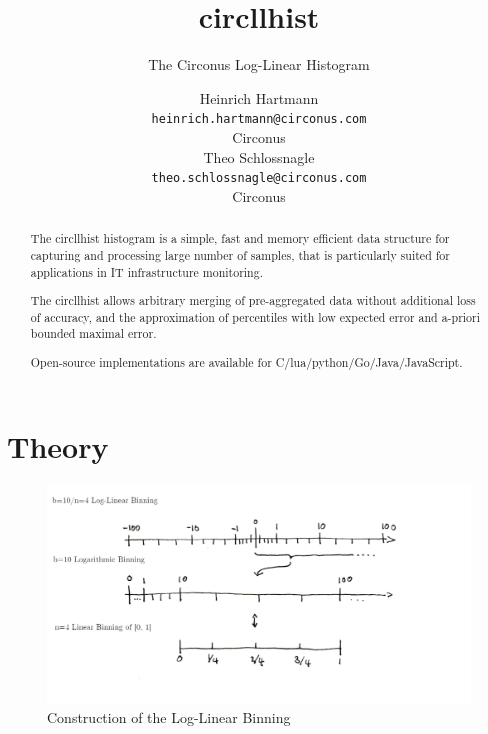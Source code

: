 \documentclass{article}
\title{circllhist}
\subtitle{The Circonus Log-Linear Histogram}
\author{
  Heinrich Hartmann \\
  \texttt{heinrich.hartmann@circonus.com} \\
  Circonus \\
  \And
  Theo Schlossnagle \\
  \texttt{theo.schlossnagle@circonus.com} \\
  Circonus
}
\theoremstyle{plain}
\theoremstyle{remark}
\begin{document}
\maketitle

\begin{abstract}
  The circllhist histogram is a simple, fast and memory efficient data structure for capturing
  and processing large number of samples, that is particularly suited for applications in
  IT infrastructure monitoring.

  The circllhist allows arbitrary merging of pre-aggregated data without additional loss of accuracy,
  and the approximation of percentiles with low expected error and a-priori bounded maximal error.

  Open-source implementations are available for C/lua/python/Go/Java/JavaScript.
\end{abstract}

\tableofcontents



\clearpage
\section{Theory}

\begin{figure}
  \includegraphics[width=\textwidth]{assets/LLBins.png}
  \caption{Construction of the Log-Linear Binning}
  \label{fig:llbins}
\end{figure}
\end{document}
